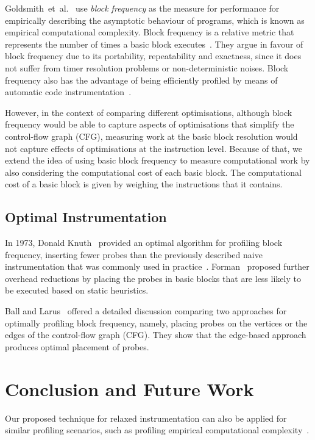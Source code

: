\documentclass[sigplan,10pt]{acmart}
\theoremstyle{definition}
\newcommand{\etal}{et~al.}
\begin{document}
Goldsmith~\etal~\cite{goldsmith07} use \textit{block frequency} as the measure for performance for empirically describing the asymptotic behaviour of programs, which is known as empirical computational complexity.
Block frequency is a relative metric that represents the number of times a basic block executes~\cite{ball94,ball96}.
They argue in favour of block frequency due to its portability, repeatability and exactness, since it does not suffer from timer resolution problems or non-deterministic noises.
Block frequency also has the advantage of being efficiently profiled by means of automatic code instrumentation~\cite{knuth73,ball94}.

However, in the context of comparing different optimisations, although block frequency would be able to capture aspects of optimisations that simplify the control-flow graph (CFG), measuring work at the basic block resolution would not capture effects of optimisations at the instruction level.
Because of that, we extend the idea of using basic block frequency to measure computational work by also considering the computational cost of each basic block.
The computational cost of a basic block is given by weighing the instructions that it contains.

\subsection{Optimal Instrumentation}

In 1973, Donald Knuth~\cite{knuth73} provided an optimal algorithm for profiling block frequency, inserting fewer probes than the previously described naive instrumentation that was commonly used in practice~\cite{knuth71}.
Forman~\cite{forman81} proposed further overhead reductions by placing the probes in basic blocks that are less likely to be executed based on static heuristics.

Ball and Larus~\cite{ball94} offered a detailed discussion comparing two approaches for optimally profiling block frequency, namely, placing probes on the vertices or the edges of the control-flow graph (CFG).
They show that the edge-based approach produces optimal placement of probes.

\section{Conclusion and Future Work}

Our proposed technique for relaxed instrumentation can also be applied for similar profiling scenarios, such as profiling empirical computational complexity~\cite{goldsmith07,zaparanuks12,coppa14}.
\end{document}
